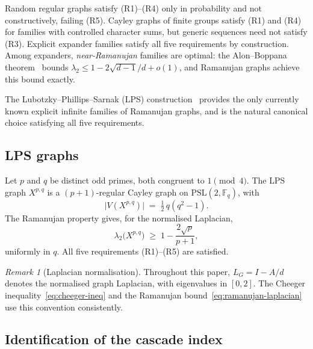 \documentclass[12pt, a4paper]{article}
\theoremstyle{plain}
\theoremstyle{definition}
\theoremstyle{remark}
\newtheorem{remark}{Remark}[section]
\begin{document}
      Random regular graphs satisfy (R1)--(R4) only in probability and not
      constructively, failing (R5).
      Cayley graphs of finite groups satisfy (R1) and (R4) for families with
      controlled character sums, but generic sequences need not satisfy (R3).
      Explicit expander families satisfy all five requirements by construction.
      Among expanders, \emph{near-Ramanujan} families are optimal: the Alon--Boppana
      theorem~\cite{Alon1986} bounds $\lambda_2 \leq 1 - 2\sqrt{d-1}/d + o(1)$, and
      Ramanujan graphs achieve this bound exactly.

      The Lubotzky--Phillips--Sarnak (LPS) construction~\cite{LPS1988} provides the
      only currently known explicit infinite families of Ramanujan graphs, and is
      the natural canonical choice satisfying all five requirements.

    \subsection{LPS graphs}
      \label{sec:model:lps}

      Let $p$ and $q$ be distinct odd primes, both congruent to $1 \pmod{4}$.
      The LPS graph $X^{p,q}$ is a $(p+1)$-regular Cayley graph on
      $\mathrm{PSL}(2, \mathbb{F}_q)$, with
      \begin{equation}
        \label{eq:lps-order}
        \bigl|V(X^{p,q})\bigr|
        \;=\; \tfrac{1}{2}\,q(q^2 - 1).
      \end{equation}
      The Ramanujan property gives, for the normalised Laplacian,
      \begin{equation}
        \label{eq:ramanujan-laplacian}
        \lambda_2\bigl(X^{p,q}\bigr)
        \;\geq\; 1 - \frac{2\sqrt{p}}{p+1},
      \end{equation}
      uniformly in $q$.
      All five requirements (R1)--(R5) are satisfied.

      \begin{remark}[Laplacian normalisation]
  Throughout this paper, $L_G = I - A/d$ denotes the normalised graph
  Laplacian, with eigenvalues in $[0,2]$.
  The Cheeger inequality~\eqref{eq:cheeger-ineq} and the Ramanujan
  bound~\eqref{eq:ramanujan-laplacian} use this convention consistently.
      \end{remark}

    \subsection{Identification of the cascade index}
      \label{sec:model:index}
\end{document}
